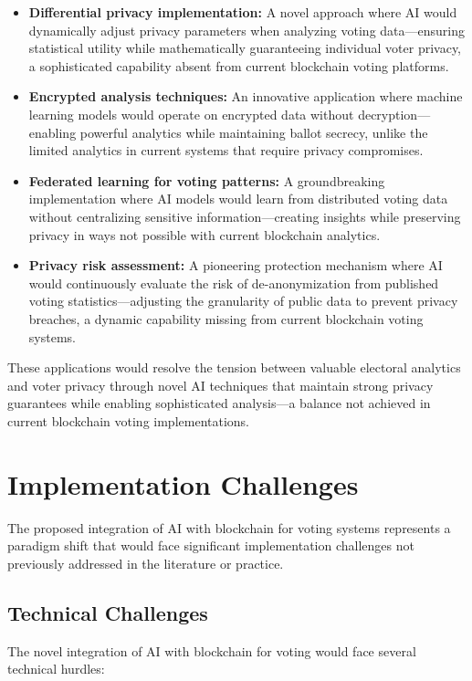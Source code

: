 \documentclass[conference]{IEEEtran}
\begin{document}
\begin{itemize}
    \item \textbf{Differential privacy implementation:} A novel approach where AI would dynamically adjust privacy parameters when analyzing voting data—ensuring statistical utility while mathematically guaranteeing individual voter privacy, a sophisticated capability absent from current blockchain voting platforms.
    
    \item \textbf{Encrypted analysis techniques:} An innovative application where machine learning models would operate on encrypted data without decryption—enabling powerful analytics while maintaining ballot secrecy, unlike the limited analytics in current systems that require privacy compromises.
    
    \item \textbf{Federated learning for voting patterns:} A groundbreaking implementation where AI models would learn from distributed voting data without centralizing sensitive information—creating insights while preserving privacy in ways not possible with current blockchain analytics.
    
    \item \textbf{Privacy risk assessment:} A pioneering protection mechanism where AI would continuously evaluate the risk of de-anonymization from published voting statistics—adjusting the granularity of public data to prevent privacy breaches, a dynamic capability missing from current blockchain voting systems.
\end{itemize}

These applications would resolve the tension between valuable electoral analytics and voter privacy through novel AI techniques that maintain strong privacy guarantees while enabling sophisticated analysis—a balance not achieved in current blockchain voting implementations.

\section{Implementation Challenges}
The proposed integration of AI with blockchain for voting systems represents a paradigm shift that would face significant implementation challenges not previously addressed in the literature or practice.

\subsection{Technical Challenges}
The novel integration of AI with blockchain for voting would face several technical hurdles:
\end{document}
